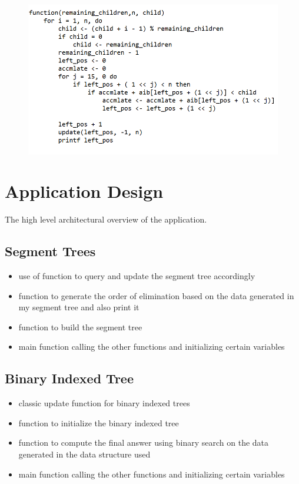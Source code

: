 \documentclass{article}
\begin{document}
\begin{figure}[h!]
\includegraphics[scale=0.7]{function_aib_alg.png}
\end{figure}

\section{Application Design}

 The high level architectural overview of the application. 

\subsection{Segment Trees}

\begin{itemize}
    \item use of function to query and update the segment tree accordingly
    \item function to generate the order of elimination based on the data generated in my segment tree and also print it
    \item function to build the segment tree
    \item main function calling the other functions and initializing certain variables
\end{itemize}

\subsection{Binary Indexed Tree}
\begin{itemize}
    \item classic update function for binary indexed trees
    \item function to initialize the binary indexed tree
    \item function to compute the final answer using binary search on the data generated in the data structure used
    \item main function calling the other functions and initializing certain variables
\end{itemize}
\end{document}
